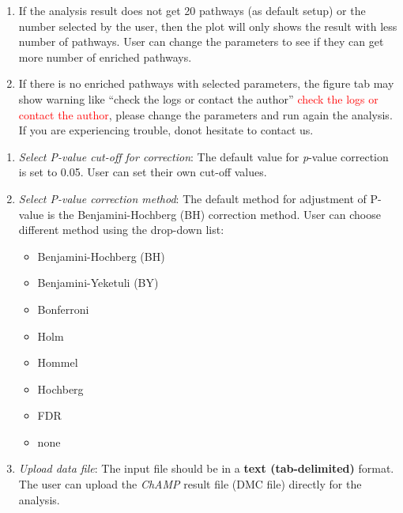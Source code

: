 \documentclass[
  a4paper,
  DIV=11,
  numbers=noendperiod,
  oneside,
  open=any]{scrreport}
\providecommand{\tightlist}{%
  \setlength{\itemsep}{0pt}\setlength{\parskip}{0pt}}\usepackage{longtable,booktabs,array}
\begin{document}
\begin{tcolorbox}[enhanced jigsaw, breakable, colback=white, colbacktitle=quarto-callout-tip-color!10!white, opacityback=0, left=2mm, bottomrule=.15mm, opacitybacktitle=0.6, coltitle=black, bottomtitle=1mm, toprule=.15mm, toptitle=1mm, arc=.35mm, titlerule=0mm, rightrule=.15mm, title=\textcolor{quarto-callout-tip-color}{\faLightbulb}\hspace{0.5em}{Tip}, colframe=quarto-callout-tip-color-frame, leftrule=.75mm]

\begin{enumerate}
\def\labelenumi{\arabic{enumi}.}
\tightlist
\item
  If the analysis result does not get 20 pathways (as default setup) or
  the number selected by the user, then the plot will only shows the
  result with less number of pathways. User can change the parameters to
  see if they can get more number of enriched pathways.
\item
  If there is no enriched pathways with selected parameters, the figure
  tab may show warning like {``check the logs or contact the author''}
  \textcolor{red}{check the logs or contact the author}, please change
  the parameters and run again the analysis. If you are experiencing
  trouble, donot hesitate to contact us.
\end{enumerate}

\end{tcolorbox}

\begin{enumerate}
\def\labelenumi{\arabic{enumi}.}
\setcounter{enumi}{3}
\item
  \emph{Select P-value cut-off for correction}: The default value for
  \emph{p}-value correction is set to 0.05. User can set their own
  cut-off values.
\item
  \emph{Select P-value correction method}: The default method for
  adjustment of P-value is the Benjamini-Hochberg (BH) correction
  method. User can choose different method using the drop-down list:

  \begin{itemize}
  \tightlist
  \item
    Benjamini-Hochberg (BH)
  \item
    Benjamini-Yeketuli (BY)
  \item
    Bonferroni
  \item
    Holm
  \item
    Hommel
  \item
    Hochberg
  \item
    FDR
  \item
    none
  \end{itemize}
\item
  \emph{Upload data file}: The input file should be in a \textbf{text
  (tab-delimited)} format. The user can upload the \emph{ChAMP} result
  file (DMC file) directly for the analysis.
\end{enumerate}
\end{document}
